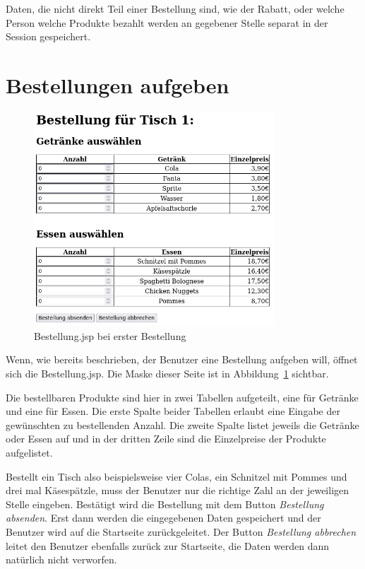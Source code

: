 Daten, die nicht direkt Teil einer Bestellung sind, wie der Rabatt, oder welche Person welche Produkte bezahlt werden an gegebener Stelle separat in der Session gespeichert.


\section{Bestellungen aufgeben} %
\label{sec:Bestellungen aufgeben}

\begin{figure}[htb]
  \centering
  \includegraphics[height=8cm]{images/InitialBestellungJSP.png}
  \caption[Bestellung.jsp bei erster Bestellung]{Bestellung.jsp bei erster Bestellung}
  \label{abb:InitialBestellungJSP}
\end{figure}

Wenn, wie bereits beschrieben, der Benutzer eine Bestellung aufgeben will, öffnet sich die Bestellung.jsp.
Die Maske dieser Seite ist in Abbildung~\ref{abb:InitialBestellungJSP} sichtbar.

Die bestellbaren Produkte sind hier in zwei Tabellen aufgeteilt, eine für Getränke und eine für Essen.
Die erste Spalte beider Tabellen erlaubt eine Eingabe der gewünschten zu bestellenden Anzahl.
Die zweite Spalte listet jeweils die Getränke oder Essen auf und in der dritten Zeile sind die Einzelpreise der Produkte aufgelistet.

Bestellt ein Tisch also beispielsweise vier Colas, ein Schnitzel mit Pommes und drei mal Käsespätzle, muss der Benutzer nur die richtige Zahl an der jeweiligen Stelle eingeben.
Bestätigt wird die Bestellung mit dem Button \textit{Bestellung absenden}.
Erst dann werden die eingegebenen Daten gespeichert und der Benutzer wird auf die Startseite zurückgeleitet.
Der Button \textit{Bestellung abbrechen} leitet den Benutzer ebenfalls zurück zur Startseite, die Daten werden dann natürlich nicht verworfen.

